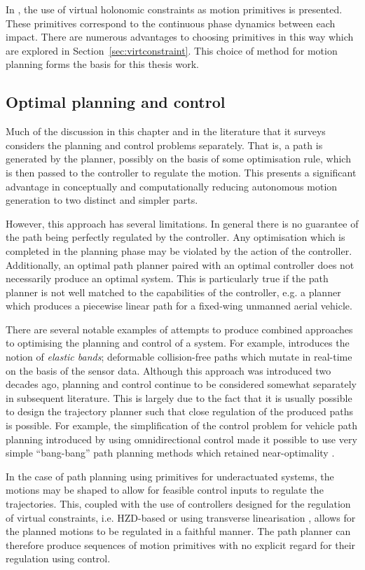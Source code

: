 In \cite{manchester13planning}, the use of virtual holonomic constraints as motion primitives is presented. These primitives correspond to the continuous phase dynamics between each impact. There are numerous advantages to choosing primitives in this way which are explored in Section~\ref{sec:virtconstraint}. This choice of method for motion planning forms the basis for this thesis work.

\subsection{Optimal planning and control}
Much of the discussion in this chapter and in the literature that it surveys considers the planning and control problems separately. That is, a path is generated by the planner, possibly on the basis of some optimisation rule, which is then passed to the controller to regulate the motion. This presents a significant advantage in conceptually and computationally reducing autonomous motion generation to two distinct and simpler parts.

However, this approach has several limitations. In general there is no guarantee of the path being perfectly regulated by the controller. Any optimisation which is completed in the planning phase may be violated by the action of the controller. Additionally, an optimal path planner paired with an optimal controller does not necessarily produce an optimal system. This is particularly true if the path planner is not well matched to the capabilities of the controller, e.g. a planner which produces a piecewise linear path for a fixed-wing unmanned aerial vehicle.

There are several notable examples of attempts to produce combined approaches to optimising the planning and control of a system. For example, \cite{quinlan1993elastic} introduces the notion of \textit{elastic bands}; deformable collision-free paths which mutate in real-time on the basis of the sensor data. Although this approach was introduced two decades ago, planning and control continue to be considered somewhat separately in subsequent literature. This is largely due to the fact that it is usually possible to design the trajectory planner such that close regulation of the produced paths is possible. For example, the simplification of the control problem for vehicle path planning introduced by using omnidirectional control made it possible to use very simple ``bang-bang'' path planning methods which retained near-optimality \cite{kalmar2004near}.

In the case of path planning using primitives for underactuated systems, the motions may be shaped to allow for feasible control inputs to regulate the trajectories. This, coupled with the use of controllers designed for the regulation of virtual constraints, i.e. HZD-based \cite{sreenath2011compliant} or using transverse linearisation \cite{manchester13planning}, allows for the planned motions to be regulated in a faithful manner. The path planner can therefore produce sequences of motion primitives with no explicit regard for their regulation using control.